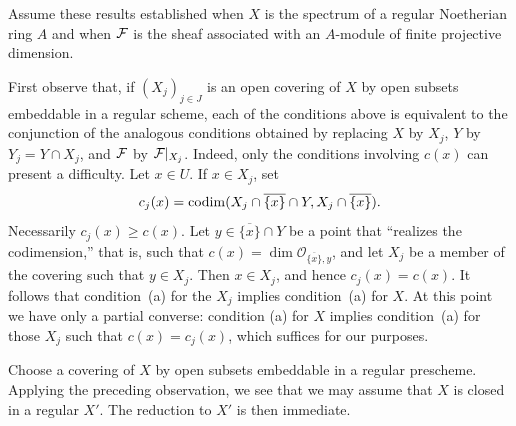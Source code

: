 
\medskip
Assume these results established when $X$ is the spectrum of a regular
Noetherian ring $A$ and when $\cF$ is the sheaf associated with an $A$-module
of finite projective dimension.

First observe that, if $(X_j)_{j\in J}$ is an open covering of $X$ by open
subsets embeddable in a regular scheme, each of the conditions above is
equivalent to the conjunction of the analogous conditions obtained by
replacing $X$ by $X_j$, $Y$ by $Y_j=Y\cap X_j$, and $\cF$ by
$\cF|_{X_j}$. Indeed, only the conditions involving $c(x)$ can present a
difficulty. Let $x\in U$. If $x\in X_j$, set
\[
  c_j(x)=\operatorname{codim}(X_j\cap\overline{\{x\}}\cap Y,
                X_j\cap\overline{\{x\}}).
\]
Necessarily $c_j(x)\geq c(x)$. Let $y\in\overline{\{x\}}\cap Y$ be a point
that ``realizes the codimension,'' that is, such that
$c(x)=\dim\mathcal O_{\overline{\{x\}},y}$, and let $X_j$ be a member of
the covering such that $y\in X_j$. Then $x\in X_j$, and hence
$c_j(x)=c(x)$. It follows that condition~(a) for the $X_j$ implies
condition~(a) for $X$. At this point we have only a partial converse: condition
(a) for $X$ implies condition~(a) for those $X_j$ such that
$c(x)=c_j(x)$, which suffices for our purposes.%


\setcounter{section}{2}\setcounter{lemma}{3}

\medskip
Choose a covering of $X$ by open subsets embeddable in a regular prescheme.
Applying the preceding observation, we see that we may assume that $X$ is
closed in a regular $X'$. The reduction to $X'$ is then immediate.

